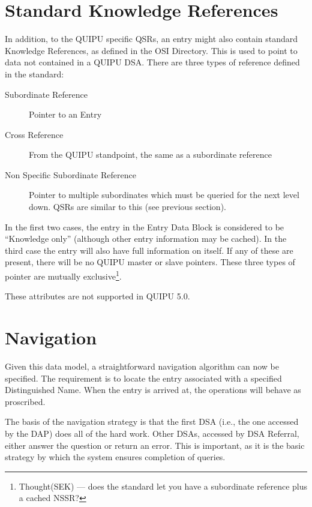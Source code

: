 \section {Standard Knowledge References}


In addition, to the QUIPU specific QSRs, an entry might also contain
standard Knowledge References, as defined in the OSI Directory.  This is
used to point to data not contained in a QUIPU DSA.  There are three types
of reference defined in the standard:

\begin {description}
\item[Subordinate Reference]  Pointer to an Entry

\item[Cross Reference] From the QUIPU standpoint, the same as a subordinate
reference

\item[Non Specific Subordinate Reference] Pointer to multiple subordinates
which must be queried for the next level down.  QSRs are similar to this
(see previous section).

\end {description}

In the first two cases, the entry in the Entry Data
Block is considered to be ``Knowledge only'' (although other entry
information may be cached). 
In the third case the entry will also have full information on itself.  
If any of these are present, there will be no QUIPU master or slave pointers.
These three types of pointer are mutually exclusive\footnote{Thought(SEK) ---
does the standard let you have a subordinate reference plus a cached NSSR?}.

These attributes are not supported in QUIPU 5.0.

\section {Navigation}

Given this data model, a straightforward navigation algorithm
can now be specified.
The requirement is to locate the entry associated with a
specified Distinguished Name.
When the entry is arrived at, the operations will behave
as proscribed.

The basis of the navigation strategy is that the first DSA (i.e., the one
accessed by the DAP) does all of the hard work.  Other DSAs, accessed by DSA
Referral, either answer the question or return an error.  This is important,
as it is the basic strategy by which the system ensures completion of
queries.

